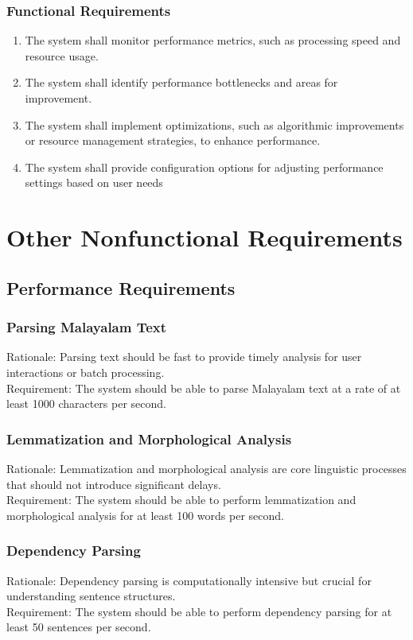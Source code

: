 \documentclass[12pt]{article}
\begin{document}
	\subsubsection{Functional Requirements}
	\begin{enumerate}
		\item The system shall monitor performance metrics, such as processing speed and
		resource usage.
		\item The system shall identify performance bottlenecks and areas for improvement.
		\item The system shall implement optimizations, such as algorithmic improvements or
		resource management strategies, to enhance performance.
		\item The system shall provide configuration options for adjusting performance settings
		based on user needs
	\end{enumerate}
	
	\section{Other Nonfunctional Requirements}
	
	\subsection{Performance Requirements}
	
	\subsubsection{Parsing Malayalam Text}
	Rationale: Parsing text should be fast to provide timely analysis for user interactions or
	batch processing.\\
	Requirement: The system should be able to parse Malayalam text at a rate of at least 1000
	characters per second.
	
	\subsubsection{Lemmatization and Morphological Analysis}
	Rationale: Lemmatization and morphological analysis are core linguistic processes that
	should not introduce significant delays.\\
	Requirement: The system should be able to perform lemmatization and morphological
	analysis for at least 100 words per second.
	
	\subsubsection{Dependency Parsing}
	Rationale: Dependency parsing is computationally intensive but crucial for understanding
	sentence structures.\\
	Requirement: The system should be able to perform dependency parsing for at least 50
	sentences per second.
	
\end{document}
